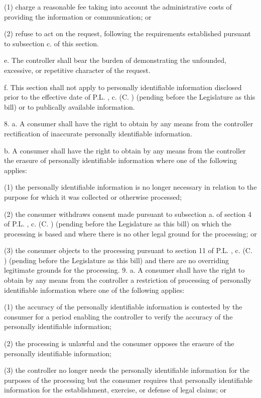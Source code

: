      (1)   charge a reasonable fee taking into account the administrative costs of providing the information or communication; or

     (2)   refuse to act on the request, following the requirements established pursuant to subsection c. of this section.

     e.     The controller shall bear the burden of demonstrating the unfounded, excessive, or repetitive character of the request.

     f.     This section shall not apply to personally identifiable information disclosed prior to the effective date of P.L.    , c.    (C.      ) (pending before the Legislature as this bill) or to publically available information.

 

     8.    a.  A consumer shall have the right to obtain by any means from the controller rectification of inaccurate personally identifiable information.

     b.    A consumer shall have the right to obtain by any means from the controller the erasure of personally identifiable information where one of the following applies:

     (1)   the personally identifiable information is no longer necessary in relation to the purpose for which it was collected or otherwise processed;

     (2)   the consumer withdraws consent made pursuant to subsection a. of section 4 of P.L.    , c.    (C.      ) (pending before the Legislature as this bill) on which the processing is based and where there is no other legal ground for the processing; or

     (3)   the consumer objects to the processing pursuant to section 11 of P.L.    , c.    (C.      ) (pending before the Legislature as this bill) and there are no overriding legitimate grounds for the processing.
     9.    a.  A consumer shall have the right to obtain by any means from the controller a restriction of processing of personally identifiable information where one of the following applies:

     (1)   the accuracy of the personally identifiable information is contested by the consumer for a period enabling the controller to verify the accuracy of the personally identifiable information;

     (2)   the processing is unlawful and the consumer opposes the erasure of the personally identifiable information;

     (3)   the controller no longer needs the personally identifiable information for the purposes of the processing but the consumer requires that personally identifiable information for the establishment, exercise, or defense of legal claims; or

